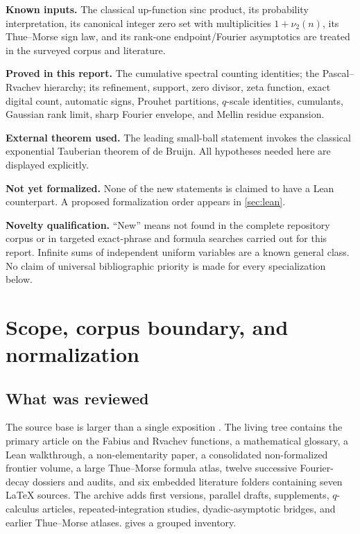\documentclass[11pt,a4paper]{article}
\theoremstyle{frontier}
\theoremstyle{definition}
\begin{document}
\begin{statusbox}
\textbf{Known inputs.}  The classical up-function sinc product, its probability interpretation, its canonical integer zero set with multiplicities $1+\nu_2(n)$, its Thue--Morse sign law, and its rank-one endpoint/Fourier asymptotics are treated in the surveyed corpus and literature.

\textbf{Proved in this report.}  The cumulative spectral counting identities; the Pascal--Rvachev hierarchy; its refinement, support, zero divisor, zeta function, exact digital count, automatic signs, Prouhet partitions, $q$-scale identities, cumulants, Gaussian rank limit, sharp Fourier envelope, and Mellin residue expansion.

\textbf{External theorem used.}  The leading small-ball statement invokes the classical exponential Tauberian theorem of de Bruijn.  All hypotheses needed here are displayed explicitly.

\textbf{Not yet formalized.}  None of the new statements is claimed to have a Lean counterpart.  A proposed formalization order appears in \cref{sec:lean}.

\textbf{Novelty qualification.}  ``New'' means not found in the complete repository corpus or in targeted exact-phrase and formula searches carried out for this report.  Infinite sums of independent uniform variables are a known general class.  No claim of universal bibliographic priority is made for every specialization below.
\end{statusbox}

\clearpage
\tableofcontents
\clearpage
{}

\section{Scope, corpus boundary, and normalization}\label{sec:scope}

\subsection{What was reviewed}

The source base is larger than a single exposition \cite{repo-docs}.  The living tree contains the primary article on the Fabius and Rvachev functions, a mathematical glossary, a Lean walkthrough, a non-elementarity paper, a consolidated non-formalized frontier volume, a large Thue--Morse formula atlas, twelve successive Fourier-decay dossiers and audits, and six embedded literature folders containing seven LaTeX sources.  The archive adds first versions, parallel drafts, supplements, $q$-calculus articles, repeated-integration studies, dyadic-asymptotic bridges, and earlier Thue--Morse atlases.   gives a grouped inventory.
\end{document}
